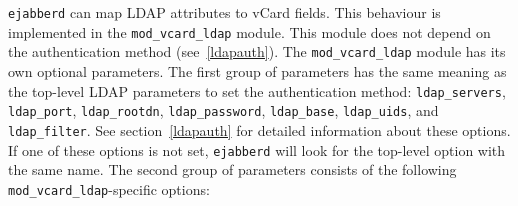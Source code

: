 \documentclass[a4paper,10pt]{article}
\newcommand{\option}[1]{\texttt{#1}}
\newcommand{\ejabberd}{\texttt{ejabberd}}
\newcommand{\module}[1]{\texttt{#1}}
\newcommand{\modvcardldap}{\module{mod\_vcard\_ldap}}
\begin{document}

\ejabberd{} can map LDAP attributes to vCard fields. This behaviour is
implemented in the \modvcardldap{} module. This module does not depend on the
authentication method (see~\ref{ldapauth}). The \modvcardldap{} module has
its own optional parameters. The first group of parameters has the same
meaning as the top-level LDAP parameters to set the authentication method:
\option{ldap\_servers}, \option{ldap\_port}, \option{ldap\_rootdn},
\option{ldap\_password}, \option{ldap\_base}, \option{ldap\_uids}, and
\option{ldap\_filter}. See section~\ref{ldapauth} for detailed information
about these options. If one of these options is not set, \ejabberd{} will look
for the top-level option with the same name. The second group of parameters
consists of the following \modvcardldap{}-specific options:
\end{document}
